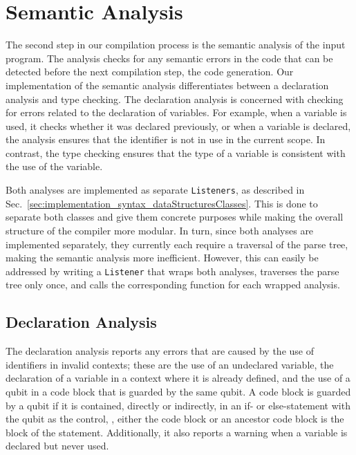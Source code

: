 \section{Semantic Analysis}
\label{sec:implementation_semenaticAnalayis}
The second step in our compilation process is the semantic analysis of the input program. The analysis checks for any semantic errors in the code that can be detected before the next compilation step, the code generation. Our implementation of the semantic analysis differentiates between a declaration analysis and type checking. The declaration analysis is concerned with checking for errors related to the declaration of variables. For example, when a variable is used, it checks whether it was declared previously, or when a variable is declared, the analysis ensures that the identifier is not in use in the current scope. In contrast, the type checking ensures that the type of a variable is consistent with the use of the variable.

Both analyses are implemented as separate \texttt{Listeners}, as described in Sec.~\ref{sec:implementation_syntax_dataStructuresClasses}.
This is done to separate both classes and give them concrete purposes while making the overall structure of the compiler more modular. In turn, since both analyses are implemented separately, they currently each require a traversal of the parse tree, making the semantic analysis more inefficient. However, this can easily be addressed by writing a \texttt{Listener} that wraps both analyses, traverses the parse tree only once, and calls the corresponding function for each wrapped analysis.

\subsection{Declaration Analysis}
\label{sec:implementation_declarationAnalayis}
The declaration analysis reports any errors that are caused by the use of identifiers in invalid contexts; these are the use of an undeclared variable, the declaration of a variable in a context where it is already defined, and the use of a qubit in a code block that is guarded by the same qubit. A code block is guarded by a qubit if it is contained, directly or indirectly, in an if- or else-statement with the qubit as the control, \ie, either the code block or an ancestor code block is the block of the statement.
Additionally, it also reports a warning when a variable is declared but never used.

